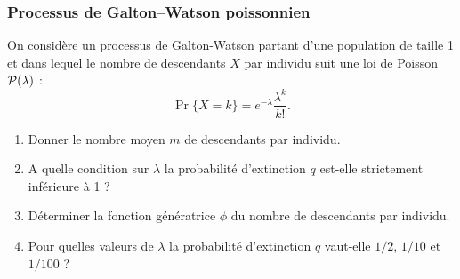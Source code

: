 \subsubsection{Processus de Galton–Watson poissonnien} 
  On considère un processus de Galton-Watson partant d'une population de taille 1 et dans lequel le nombre de descendants $X$ par individu suit une loi de Poisson $\mathcal{P}(\lambda)$ :
  $$
  \Pr\{X = k\} = e^{-\lambda} \frac{\lambda^k}{k!}.
  $$
  \begin{enumerate}
    \item Donner le nombre moyen $m$ de descendants par individu.
    \item A quelle condition sur $\lambda$ la probabilité d'extinction $q$ est-elle strictement inférieure à 1 ?
    \item Déterminer la fonction génératrice $\phi$ du nombre de descendants par individu.
    \item Pour quelles valeurs de $\lambda$ la probabilité d'extinction $q$ vaut-elle $1/2$,  $1/10$ et $1/100$ ?
  \end{enumerate}
